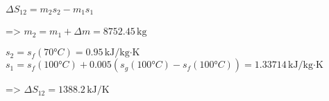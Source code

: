 \( \Delta S_{12} = m_{2} s_{2} - m_{1} s_{1} \)  

=> \( m_{2} = m_{1} + \Delta m = 8752.45 \, \text{kg} \)  

\( s_{2} = s_{f}(70°C) = 0.95 \, \text{kJ/kg·K} \)  
\( s_{1} = s_{f}(100°C) + 0.005 (s_{g}(100°C) - s_{f}(100°C)) = 1.33714 \, \text{kJ/kg·K} \)  

=> \( \Delta S_{12} = 1388.2 \, \text{kJ/K} \)